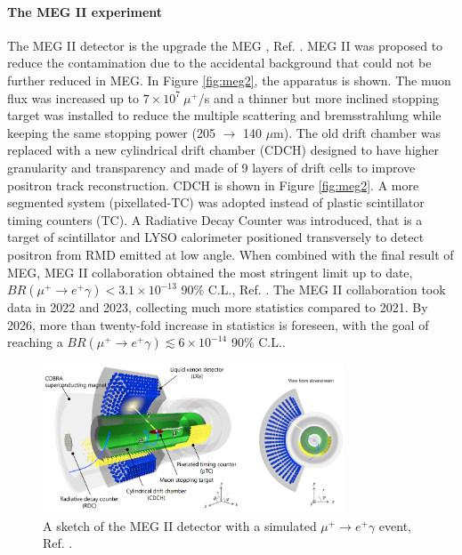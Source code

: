 \paragraph{The MEG II experiment}
The MEG II detector is the upgrade  the MEG , Ref. \cite{megiicollaboration2024operation}.
MEG II was proposed to reduce the contamination due to the accidental background that could not be further reduced in MEG.
In Figure \ref{fig:meg2}, the apparatus is shown. The muon flux was increased up to $7 \times 10^7 \ \mu^+$/s and a thinner but more inclined 
stopping target was installed to reduce the multiple scattering and bremsstrahlung 
while keeping the same stopping power (205 $\rightarrow$ 140 $\mu$m).
The old drift chamber was replaced with a new cylindrical drift chamber (CDCH) designed
to have higher granularity and transparency and made of 9 layers of drift cells to
improve positron track reconstruction. CDCH is shown 
in Figure \ref{fig:meg2}.
A more segmented system (pixellated-TC) was adopted instead of plastic scintillator timing counters (TC).
A Radiative Decay Counter was introduced, that is a target of scintillator and LYSO calorimeter positioned transversely to detect positron from RMD emitted at low angle.
When combined with the final result of MEG, MEG II collaboration obtained the most stringent limit up to date, $BR(\mu^+ \rightarrow e^+ \gamma)<3.1\times 10^{-13}$ 90\% C.L., Ref. \cite{megiicollaboration2024search}.
The MEG II collaboration took data in 2022 and 2023, collecting much more statistics compared to 2021. By 2026, more than twenty-fold increase in statistics is foreseen, with the goal of reaching a
$BR(\mu^+ \rightarrow e^+ \gamma)\lesssim 6\times 10^{-14}$ 90\% C.L..
\begin{figure}[!h]
    \centering
    \includegraphics[width =0.8\textwidth]{figures/png/Screenshot_20240307_140116.png}
    \caption[MEG II detector (I).]{A sketch of the MEG II detector with a simulated $\mu^+ \rightarrow e^+ \gamma $ event, Ref. \cite{megiicollaboration2024operation}.}
    \label{fig:meg22}
    \end{figure}
